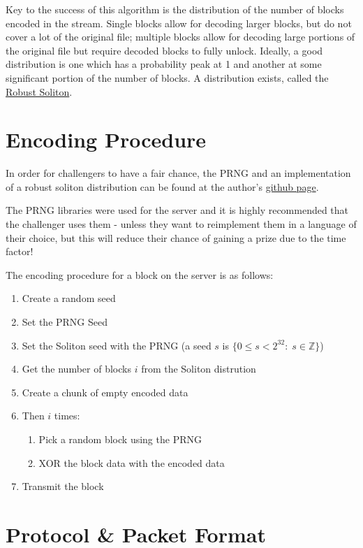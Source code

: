 \documentclass[10pt,a4paper]{article}
\begin{document}
Key to the success of this algorithm is the distribution of the number of blocks encoded in the stream.
Single blocks allow for decoding larger blocks, but do not cover a lot of the original file; multiple blocks allow for decoding large portions of the original file but require decoded blocks to fully unlock.
Ideally, a good distribution is one which has a probability peak at 1 and another at some significant portion of the number of blocks.
A distribution exists, called the \href{http://en.wikipedia.org/wiki/Soliton_distribution}{Robust Soliton}.

\section{Encoding Procedure}

In order for challengers to have a fair chance, the PRNG and an implementation of a robust soliton distribution can be found at the author's \href{http://github.com/carl-ellis/}{github page}.

The PRNG libraries were used for the server and it is highly recommended that the challenger uses them - unless they want to reimplement them in a language of their choice, but this will reduce their chance of gaining a prize due to the time factor!

The encoding procedure for a block on the server is as follows:

\begin{enumerate}
	\item Create a random seed
	\item Set the PRNG Seed
	\item Set the Soliton seed with the PRNG (a seed $s$ is $ \{ 0 \leq s < 2^{32} : \; s \in \mathbb{Z} \}$)
	\item Get the number of blocks $i$ from the Soliton distrution
	\item Create a chunk of empty encoded data
	\item Then $i$ times:
	\begin{enumerate}
		\item Pick a random block using the PRNG
		\item XOR the block data with the encoded data
	\end{enumerate}
	\item Transmit the block 
\end{enumerate}


\section{Protocol \& Packet Format}
\end{document}
